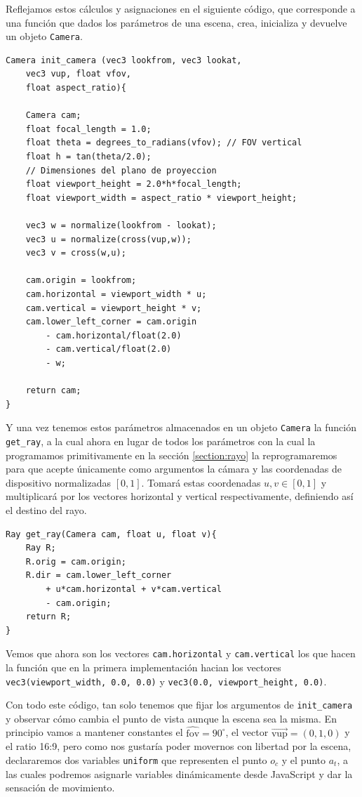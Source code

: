 Reflejamos estos cálculos y asignaciones en el siguiente código, que corresponde a una función que dados los parámetros de una escena, crea, inicializa y devuelve un objeto \verb|Camera|.
\begin{lstlisting}
Camera init_camera (vec3 lookfrom, vec3 lookat, 
    vec3 vup, float vfov, 
    float aspect_ratio){
    
    Camera cam;
    float focal_length = 1.0;
    float theta = degrees_to_radians(vfov); // FOV vertical
    float h = tan(theta/2.0);
    // Dimensiones del plano de proyeccion
    float viewport_height = 2.0*h*focal_length;
    float viewport_width = aspect_ratio * viewport_height;

    vec3 w = normalize(lookfrom - lookat);
    vec3 u = normalize(cross(vup,w));
    vec3 v = cross(w,u);

    cam.origin = lookfrom;
    cam.horizontal = viewport_width * u;
    cam.vertical = viewport_height * v;
    cam.lower_left_corner = cam.origin 
        - cam.horizontal/float(2.0) 
        - cam.vertical/float(2.0)
        - w;

    return cam;
}
\end{lstlisting}

Y una vez tenemos estos parámetros almacenados en un objeto \verb|Camera| la función \verb|get_ray|, a la cual ahora en lugar de todos los parámetros con la cual la programamos primitivamente en la sección \ref{section:rayo} la reprogramaremos para que acepte únicamente como argumentos la cámara y las coordenadas de dispositivo normalizadas $[0,1]$. Tomará estas coordenadas $u,v\in[0,1]$ y multiplicará por los vectores horizontal y vertical respectivamente, definiendo así el destino del rayo.

\begin{lstlisting}
Ray get_ray(Camera cam, float u, float v){
    Ray R;
    R.orig = cam.origin;
    R.dir = cam.lower_left_corner 
        + u*cam.horizontal + v*cam.vertical 
        - cam.origin;
    return R;
}
\end{lstlisting}

Vemos que ahora son los vectores \verb|cam.horizontal| y \verb|cam.vertical| los que hacen la función que en la primera implementación hacian los vectores \verb|vec3(viewport_width, 0.0, 0.0)| y \verb|vec3(0.0, viewport_height, 0.0)|.

Con todo este código, tan solo tenemos que fijar los argumentos de \verb|init_camera| y observar cómo cambia el punto de vista aunque la escena sea la misma. En principio vamos a mantener constantes el $\widehat{\mathrm{fov}}=90^\circ$, el vector $\overrightarrow{\mathrm{vup}}=(0,1,0)$ y el ratio 16:9, pero como nos gustaría poder movernos con libertad por la escena, declararemos dos variables \verb|uniform| que representen el punto $o_c$ y el punto $a_t$, a las cuales podremos asignarle variables dinámicamente desde JavaScript y dar la sensación de movimiento.

